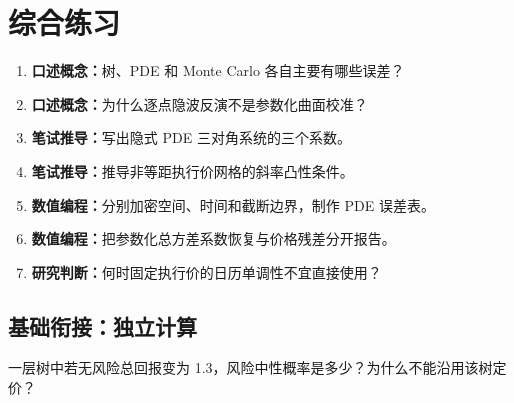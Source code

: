 \section{综合练习}
\begin{enumerate}
  \item \textbf{口述概念：}树、PDE 和 Monte Carlo 各自主要有哪些误差？
  \item \textbf{口述概念：}为什么逐点隐波反演不是参数化曲面校准？
  \item \textbf{笔试推导：}写出隐式 PDE 三对角系统的三个系数。
  \item \textbf{笔试推导：}推导非等距执行价网格的斜率凸性条件。
  \item \textbf{数值编程：}分别加密空间、时间和截断边界，制作 PDE 误差表。
  \item \textbf{数值编程：}把参数化总方差系数恢复与价格残差分开报告。
  \item \textbf{研究判断：}何时固定执行价的日历单调性不宜直接使用？
\end{enumerate}


\MFQMappedDerivativesNumericsQuestions

\subsection*{基础衔接：独立计算}
一层树中若无风险总回报变为 1.3，风险中性概率是多少？为什么不能沿用该树定价？
